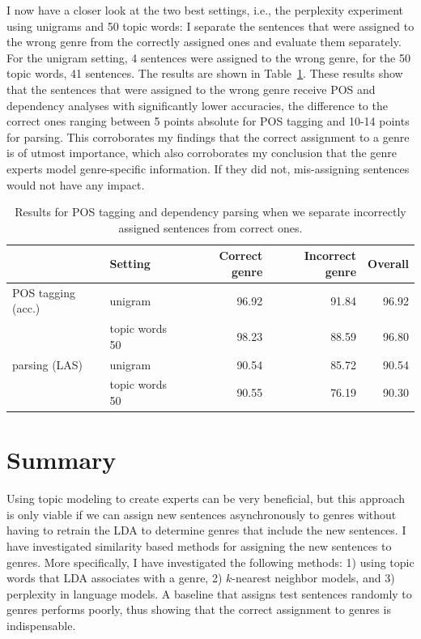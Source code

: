 I now have a closer look at the two best settings, i.e., the perplexity experiment using unigrams and 50 topic words: I separate the sentences that were assigned to the wrong genre from the correctly assigned ones and evaluate them separately. For the unigram setting, 4 sentences were assigned to the wrong genre, for the 50 topic words, 41 sentences. The results are shown in Table~\ref{tab:comp}.  These results show that the sentences that were assigned to the wrong genre receive POS and dependency analyses with significantly lower accuracies, the difference to the correct ones ranging between 5 points absolute for POS tagging and 10-14 points for parsing. This corroborates my findings that the correct assignment to a genre is of utmost importance, which also corroborates my conclusion that the genre experts model genre-specific information. If they did not, mis-assigning sentences would not have any impact.

\begin{table}[t]
\centering
\begin{tabular}{ll|rrr|}
 & Setting & Correct genre & Incorrect genre  & Overall \\ \hline
POS tagging (acc.) & unigram & 96.92 &  91.84 & 96.92\\
&  topic words 50 & 98.23 & 88.59 & 96.80\\
parsing (LAS) & unigram& 90.54& 85.72 & 90.54  \\
& topic words 50 & 90.55 & 76.19 & 90.30\\ \hline
\end{tabular}
\caption{Results for POS tagging and dependency parsing when we separate incorrectly assigned sentences from correct ones.}
\label{tab:comp}
\end{table}

\section{Summary} \label{conc}

Using topic modeling to create experts can be very beneficial, but this approach is only viable if we can assign new sentences asynchronously to genres without having to retrain the LDA to determine genres that include the new sentences. I have investigated similarity based methods for assigning the new sentences to genres.
More specifically, I have  investigated the following methods:  1) using topic words that LDA associates with a genre, 2) $k$-nearest neighbor models, and 3) perplexity in language models. A baseline that assigns test sentences randomly to genres performs poorly, thus showing that the correct assignment to genres is indispensable.

